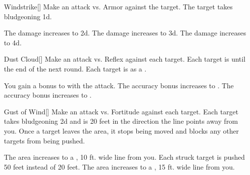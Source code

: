 \lowercase{\hypertarget{spell:Windstrike}{}}\label{spell:Windstrike}
\begin{freeability}[Rank 1]{\hypertarget{spell:Windstrike}{Windstrike}}[]
Make an attack vs. Armor against the target.
\hit The target takes bludgeoning  \plus1d.

\rankline
{} The damage increases to  \plus2d.
 The damage increases to  \plus3d.
 The damage increases to  \plus4d.

\end{freeability}
\vspace{0.25em}



\lowercase{\hypertarget{spell:Dust Cloud}{}}\label{spell:Dust Cloud}
\begin{freeability}[Rank 2]{\hypertarget{spell:Dust Cloud}{Dust Cloud}}[]
Make an attack vs. Reflex against each target.
\hit Each target is  until the end of the next round.
\crit Each target is  as a .

\rankline
{} You gain a  bonus to  with the attack.
 The accuracy bonus increases to .
 The accuracy bonus increases to .

\end{freeability}
\vspace{0.25em}



\lowercase{\hypertarget{spell:Gust of Wind}{}}\label{spell:Gust of Wind}
\begin{freeability}[Rank 2]{\hypertarget{spell:Gust of Wind}{Gust of Wind}}[]
Make an attack vs. Fortitude against each target.
\hit Each target takes bludgeoning  \minus2d and is  20 feet in the direction the line points away from you.
Once a target leaves the area, it stops being moved and blocks any other targets from being pushed.

\rankline
{} The area increases to a \areahuge, 10 ft. wide line from you.
 Each struck target is pushed 50 feet instead of 20 feet.
 The area increases to a \areaext, 15 ft. wide line from you.

\end{freeability}
\vspace{0.25em}



